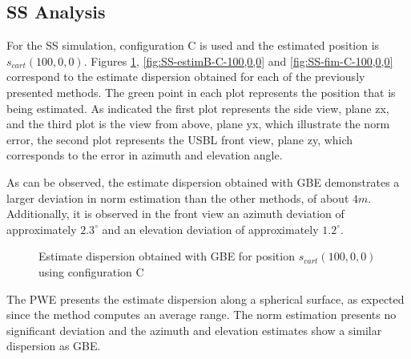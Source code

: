 \subsection{SS Analysis}

For the SS simulation, configuration C is used and the estimated position is $s_{cart}(100,0,0)$. Figures \ref{fig:SS-estimA-C-100,0,0}, \ref{fig:SS-estimB-C-100,0,0} and \ref{fig:SS-fim-C-100,0,0} correspond to the estimate dispersion obtained for each of the previously presented methods. The green point in each plot represents the position that is being estimated. As indicated the first plot represents the side view, plane zx, and the third plot is the view from above, plane yx, which illustrate the norm error, the second plot represents the USBL front view, plane zy, which corresponds to the error in azimuth and elevation angle.

As can be observed, the estimate dispersion obtained with GBE demonstrates a larger deviation in norm estimation than the other methods, of about $4m$. Additionally, it is observed in the front view an azimuth deviation of approximately $2.3^{\circ}$ and an elevation deviation of approximately $1.2^{\circ}$.

\begin{figure}[!htbp]
	\captionsetup{justification=centering,margin=2cm}
	\caption{Estimate dispersion obtained with GBE for position $s_{cart}(100,0,0)$ using configuration C}
	\label{fig:SS-estimA-C-100,0,0}
\end{figure}

The PWE presents the estimate dispersion along a spherical surface, as expected since the method computes an average range. The norm estimation presents no significant deviation and the azimuth and elevation estimates show a similar dispersion as GBE.

